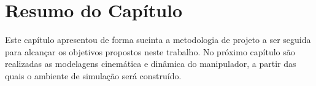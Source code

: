 \section{Resumo do Capítulo}
\label{metodo1b}

Este capítulo apresentou de forma sucinta a metodologia de projeto a ser seguida para 
alcançar os objetivos propostos neste trabalho. No próximo capítulo são realizadas 
as modelagens cinemática e dinâmica do manipulador, a partir das quais o ambiente de 
simulação será construído.


\clearpage